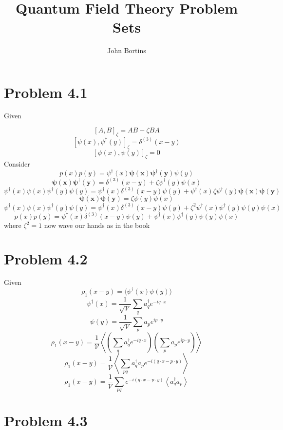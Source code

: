 \documentclass{article}
\title{Quantum Field Theory Problem Sets}
\author{John Bortins}
\begin{document}
 
\maketitle{}
 
\section*{Problem 4.1}
 
Given

\[[A,B]_\zeta=AB-\zeta BA\]
\[[\psi(x),\psi^\dagger (y)]_\zeta=\delta^{(3)}(x-y)\]
\[[\psi(x),\psi(y)]_\zeta=0\]
Consider \[p(x)p(y)=\psi^\dagger (x)\boldsymbol{\psi(x)\psi^\dagger (y)}\psi(y)\]
	\[\boldsymbol{\psi(x)\psi^\dagger (y)}=\delta^{(3)}(x-y)+\zeta\psi^\dagger (y)\psi(x)\]
\[\psi^\dagger (x)\psi(x)\psi^\dagger (y)\psi(y)=\psi^\dagger (x)\delta^{(3)}(x-y)\psi(y)+\psi^\dagger (x)\zeta\psi^\dagger (y)\boldsymbol{\psi(x)\psi(y)}\]
\[\boldsymbol{\psi(x)\psi(y)}=\zeta\psi(y)\psi(x)\]
\[\psi^\dagger (x)\psi(x)\psi^\dagger (y)\psi(y)=\psi^\dagger (x)\delta^{(3)}(x-y)\psi(y)+\zeta^2\psi^\dagger (x)\psi^\dagger (y)\psi(y)\psi(x)\]
\[p(x)p(y)=\psi^\dagger (x)\delta^{(3)}(x-y)\psi(y)+\psi^\dagger (x)\psi^\dagger (y)\psi(y)\psi(x)\]
where $\zeta^2=1$
now wave our hands as in the book

\section*{Problem 4.2}

Given \[\rho_1(x-y)=\langle \psi^\dagger (x)\psi(y)\rangle\]
\[\psi^\dagger (x)=\frac{1}{\sqrt{\mathcal{V}}}\sum_q a^\dagger_q e^{-iq\cdot x}\]
\[\psi(y)=\frac{1}{\sqrt{\mathcal{V}}}\sum_p a_p e^{ip\cdot y}\]
\[\rho_1(x-y)=\frac{1}{\mathcal{V}} \left\langle \left( \sum_q a^\dagger_q e^{-iq\cdot x}
\right)\left(\sum_p a_p e^{ip\cdot y}\right)\right\rangle\]
\[\rho_1(x-y)=\frac{1}{\mathcal{V}} \left\langle \sum_{pq} a^\dagger_q a_p e^{-i(q\cdot x-p\cdot y)}\right\rangle\]
\[\rho_1(x-y)=\frac{1}{\mathcal{V}} \sum_{pq} e^{-i(q\cdot x-p\cdot y)} \left\langle a^\dagger_q a_p \right\rangle\]

\section*{Problem 4.3}
\end{document}
